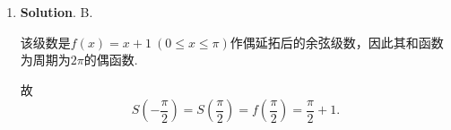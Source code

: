 \documentclass[../main.tex]{subfiles}
\begin{document}
\begin{enumerate}
        对于A选项，令$a_n=\dfrac1n$，则$\lim\limits_{n\to\infty}a_n=0$，但调和级数$\sum_{n=1}^{\infty}\frac1n$发散.

        对于B选项，令$a_n=\dfrac1{n^2}$，则$\sum\limits_{n=1}^{\infty}a_n$收敛，但$
          l=\lim_{n\to\infty}\frac{a_{n+1}}{a_n}
          =\lim_{n\to\infty}\frac{n^2}{(n+1)^2}=1$.

        对于C选项，令
        \[
          a_n=\frac{(-1)^n}{\sqrt n}+\frac1n,\qquad
          b_n=\frac{(-1)^n}{\sqrt n},
        \]
        则$\sum b_n$由Leibniz判别法可知收敛，且
        \[
          \lim_{n\to\infty}\frac{a_n}{b_n}
          =\lim_{n\to\infty}\left(1+\frac{\frac{1}{n}}{\frac{(-1)^n}{\sqrt n}}\right)
          =\lim_{n\to\infty}\left(1+\frac{(-1)^n}{\sqrt n}\right)=1.
        \]
        但$\sum a_n=\sum b_n+\sum\dfrac1n$发散.

        对于D选项，若$\sum a_n$绝对收敛，则$\sum |a_n|$收敛. 又$\sum |a_{2n}|$是$\sum |a_n|$的子级数，故$\sum |a_{2n}|$收敛，

        因而$\sum a_{2n}$绝对收敛，故D正确.

  \item \textbf{Solution}. B.

        该级数是$f(x)=x+1\ (0\le x\le\pi)$作偶延拓后的余弦级数，因此其和函数为周期为$2\pi$的偶函数.

        故
        \[
          S\left(-\frac{\pi}{2}\right)=S\left(\frac{\pi}{2}\right)
          =f\left(\frac{\pi}{2}\right)=\frac{\pi}{2}+1.
        \]
\end{enumerate}
\end{document}
